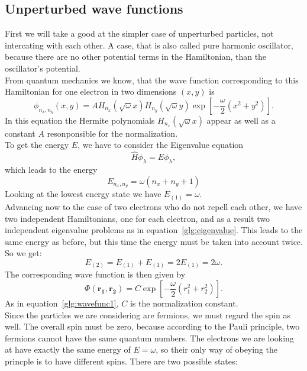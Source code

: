 \subsection{Unperturbed wave functions}\label{sec:unperturbed}
First we will take a good at the simpler case of unperturbed particles, not intercating with each other. A case, that is also called pure harmonic oscillator, because there are no other potential terms in the Hamiltonian, than the oscillator's potential.\\
From quantum mechanics we know, that the wave function corresponding to this Hamiltonian for one electron in two dimensions $(x,y)$ is
\begin{equation}\label{glg:wavefunc1}
\phi_{n_x,n_y}(x,y) = A H_{n_x} (\sqrt{\omega} x) H_{n_y} (\sqrt{\omega} y) \exp\left[-\frac{\omega}{2} (x^2+y^2)\right].
\end{equation}
In this equation the Hermite polynomials $H_{n_x} (\sqrt{\omega} x)$ appear as well as a constant $A$ resonponsible for the normalization.\\
To get the energy $E$, we have to consider the Eigenvalue equation
\begin{equation}\label{glg:eigenvalue}
\hat{H} \phi_\lambda = E \phi_\lambda,
\end{equation}
which leads to the energy
\begin{equation}
E_{n_x,n_y} = \omega(n_x + n_y +1)
\end{equation}
Looking at the lowest energy state we have $E_{(1)}=\omega$.\\
Advancing now to the case of two electrons who do not repell each other, we have two independent Hamiltonians, one for each electron, and as a result two independent eigenvalue problems as in equation~\ref{glg:eigenvalue}. This leads to the same energy as before, but this time the energy must be taken into account twice. So we get:
\begin{equation}
E_{(2)} = E_{(1)} + E_{(1)} = 2 E_{(1)} = 2\omega.
\end{equation}
The corresponding wave function is then given by
\begin{equation}
\Phi(\mathbf{r_1},\mathbf{r_2}) = C \exp\left[-\frac{\omega}{2} (r_1^2+r_2^2)\right].
\end{equation}
As in equation~\ref{glg:wavefunc1}, $C$ is the normalization constant.\\
Since the particles we are considering are fermions, we must regard the spin as well. The overall spin must be zero, because according to the Pauli principle, two fermions cannot have the same quantum numbers. The electrons we are looking at have exactly the same energy of $E = \omega$, so their only way of obeying the princple is to have different spins. There are two possible states:
